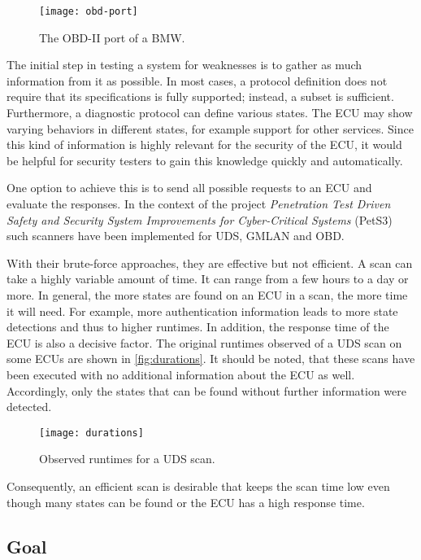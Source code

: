 \begin{figure}[h]
    \centering
    \texttt{[image: obd-port]}
    \caption{The OBD-II port of a BMW.}
    \label{fig:obd-port}
\end{figure}

The initial step in testing a system for weaknesses is to gather as much information from it as possible. In most cases, a protocol definition does not require that its specifications is fully supported; instead, a subset is sufficient.
Furthermore, a diagnostic protocol can define various states. The ECU may show varying behaviors in different states, for example support for other services. Since this kind of information is highly relevant for the security of the ECU, it would be helpful for security testers to gain this knowledge quickly and automatically.

One option to achieve this is to send all possible requests to an ECU and evaluate the responses. In the context of the project \emph{Penetration Test Driven Safety and Security System Improvements for Cyber-Critical Systems} (PetS3) \cite{pets3} such scanners have been implemented for UDS, GMLAN and OBD.

With their brute-force approaches, they are effective but not efficient. A scan can take a highly variable amount of time. It can range from a few hours to a day or more. In general, the more states are found on an ECU in a scan, the more time it will need. For example, more authentication information leads to more state detections and thus to higher runtimes. In addition, the response time of the ECU is also a decisive factor. The original runtimes observed of a UDS scan on some ECUs are shown in \autoref{fig:durations}. It should be noted, that these scans have been executed with no additional information about the ECU as well. Accordingly, only the states that can be found without further information were detected.

\begin{figure}[h]
    \centering
    \texttt{[image: durations]}
    \caption{Observed runtimes for a UDS scan.}
    \label{fig:durations}
\end{figure}

Consequently, an efficient scan is desirable that keeps the scan time low even though many states can be found or the ECU has a high response time.

\subsection{Goal}

